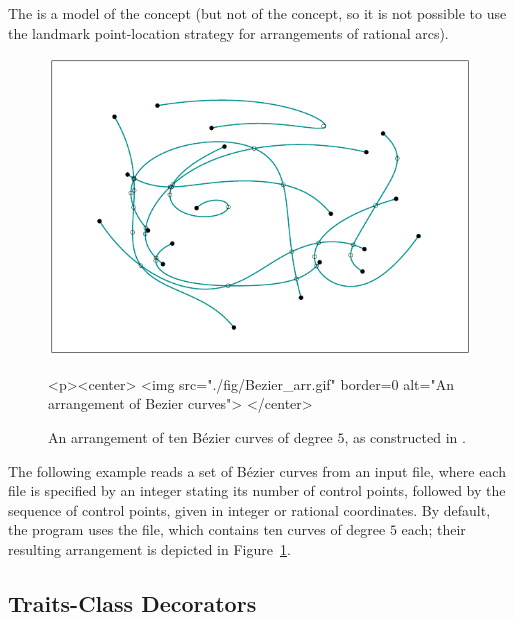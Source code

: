 The  is a model of the
 concept (but not of the
 concept, so it is not possible
to use the landmark point-location strategy for arrangements of
rational arcs).

\begin{figure}[t]
\begin{ccTexOnly}
  \begin{center}
  \includegraphics{Arrangement_2/fig/Bezier_arr}
  \end{center}
\end{ccTexOnly}
\begin{ccHtmlOnly}
  <p><center>
  <img src="./fig/Bezier_arr.gif" border=0 alt="An arrangement of Bezier curves">
  </center>
\end{ccHtmlOnly}
\caption{An arrangement of ten B\'ezier curves of degree $5$, as
constructed in .\label{arr_fig:ex_bez}}
\end{figure}

The following example reads a set of B\'ezier curves from an input
file, where each file is specified by an integer stating its number
of control points, followed by the sequence of control points, given
in integer or rational coordinates. By default, the program uses
the  file, which contains ten curves of degree $5$
each; their resulting arrangement is depicted in
Figure~\ref{arr_fig:ex_bez}.



\subsection{Traits-Class Decorators\label{arr_ssec:meta_tr}}

